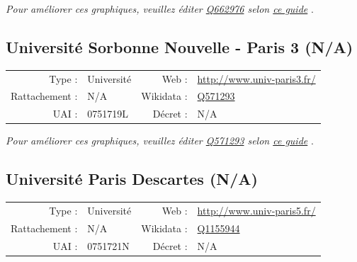 \documentclass[12pt,french,landscape]{article}
\begin{document}
\textit{\scriptsize Pour améliorer ces graphiques, veuillez éditer \href{https://www.wikidata.org/entity/Q662976}{Q662976}  selon \href{https://github.com/cpesr/wikidataESR/blob/master/Rmd/wikidataESR.md}{ce guide}}
.


\newpage

\hypertarget{universituxe9-sorbonne-nouvelle---paris-3-na}{%
\subsection{Université Sorbonne Nouvelle - Paris 3
(N/A)}\label{universituxe9-sorbonne-nouvelle---paris-3-na}}

\begin{tabular*}{0.45\textwidth}{rp{2cm}rl}  
\hline  
Type : & Université & Web : &\href{http://www.univ-paris3.fr/}{http://www.univ-paris3.fr/} \\  
Rattachement : & N/A & Wikidata : & \href{https://www.wikidata.org/entity/Q571293}{Q571293} \\  
UAI : & 0751719L & Décret : & N/A \\  
\hline  
\end{tabular*}

\textit{\scriptsize Pour améliorer ces graphiques, veuillez éditer \href{https://www.wikidata.org/entity/Q571293}{Q571293}  selon \href{https://github.com/cpesr/wikidataESR/blob/master/Rmd/wikidataESR.md}{ce guide}}
.


\newpage

\hypertarget{universituxe9-paris-descartes-na}{%
\subsection{Université Paris Descartes
(N/A)}\label{universituxe9-paris-descartes-na}}

\begin{tabular*}{0.45\textwidth}{rp{2cm}rl}  
\hline  
Type : & Université & Web : &\href{http://www.univ-paris5.fr/}{http://www.univ-paris5.fr/} \\  
Rattachement : & N/A & Wikidata : & \href{https://www.wikidata.org/entity/Q1155944}{Q1155944} \\  
UAI : & 0751721N & Décret : & N/A \\  
\hline  
\end{tabular*}
\end{document}
